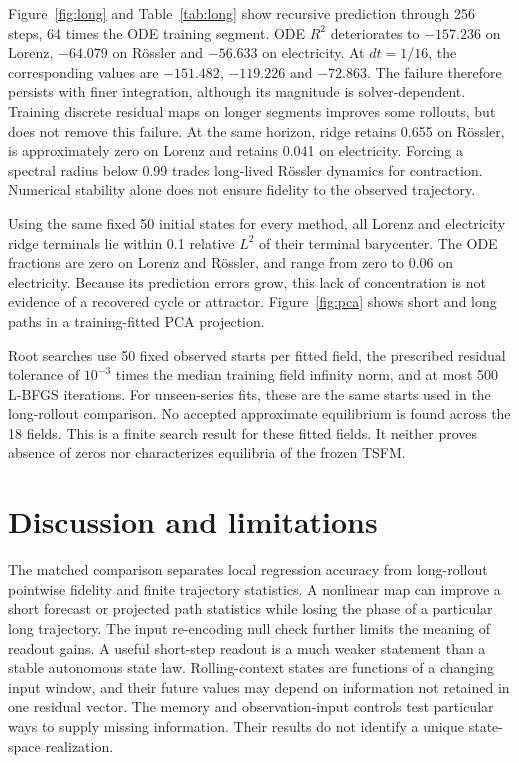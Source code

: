 \documentclass[10pt,a4paper,twocolumn]{article}
\begin{document}
Figure~\ref{fig:long} and Table~\ref{tab:long} show recursive prediction through 256 steps, 64 times the ODE training segment.
ODE $R^2$ deteriorates to $-157.236$ on Lorenz, $-64.079$ on R\"ossler and $-56.633$ on electricity.
At $dt=1/16$, the corresponding values are $-151.482$, $-119.226$ and $-72.863$.
The failure therefore persists with finer integration, although its magnitude is solver-dependent.
Training discrete residual maps on longer segments improves some rollouts, but does not remove this failure.
At the same horizon, ridge retains 0.655 on R\"ossler, is approximately zero on Lorenz and retains 0.041 on electricity.
Forcing a spectral radius below 0.99 trades long-lived R\"ossler dynamics for contraction.
Numerical stability alone does not ensure fidelity to the observed trajectory.

Using the same fixed 50 initial states for every method, all Lorenz and electricity ridge terminals lie within 0.1 relative $L^2$ of their terminal barycenter.
The ODE fractions are zero on Lorenz and R\"ossler, and range from zero to 0.06 on electricity.
Because its prediction errors grow, this lack of concentration is not evidence of a recovered cycle or attractor.
Figure~\ref{fig:pca} shows short and long paths in a training-fitted PCA projection.

Root searches use 50 fixed observed starts per fitted field, the prescribed residual tolerance of $10^{-3}$ times the median training field infinity norm, and at most 500 L-BFGS iterations.
For unseen-series fits, these are the same starts used in the long-rollout comparison.
No accepted approximate equilibrium is found across the 18 fields.
This is a finite search result for these fitted fields.
It neither proves absence of zeros nor characterizes equilibria of the frozen TSFM.

\section{Discussion and limitations}
The matched comparison separates local regression accuracy from long-rollout pointwise fidelity and finite trajectory statistics.
A nonlinear map can improve a short forecast or projected path statistics while losing the phase of a particular long trajectory.
The input re-encoding null check further limits the meaning of readout gains.
A useful short-step readout is a much weaker statement than a stable autonomous state law.
Rolling-context states are functions of a changing input window, and their future values may depend on information not retained in one residual vector.
The memory and observation-input controls test particular ways to supply missing information.
Their results do not identify a unique state-space realization.
\end{document}
